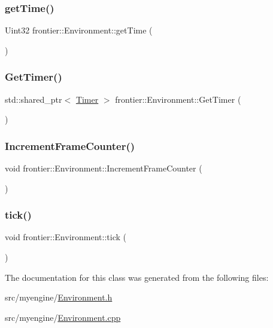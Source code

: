 \subsubsection{\texorpdfstring{get\+Time()}{getTime()}}
{\footnotesize\ttfamily Uint32 frontier\+::\+Environment\+::get\+Time (\begin{DoxyParamCaption}{ }\end{DoxyParamCaption})}

\mbox{\label{classfrontier_1_1_environment_a1e5a50e5f54b908516a24b02672ebab0}} 
\subsubsection{\texorpdfstring{Get\+Timer()}{GetTimer()}}
{\footnotesize\ttfamily std\+::shared\+\_\+ptr$<$ \hyperlink{classfrontier_1_1_timer}{Timer} $>$ frontier\+::\+Environment\+::\+Get\+Timer (\begin{DoxyParamCaption}{ }\end{DoxyParamCaption})}

\mbox{\label{classfrontier_1_1_environment_a8cc8f5708b26f9366e620d13bb031e42}} 
\subsubsection{\texorpdfstring{Increment\+Frame\+Counter()}{IncrementFrameCounter()}}
{\footnotesize\ttfamily void frontier\+::\+Environment\+::\+Increment\+Frame\+Counter (\begin{DoxyParamCaption}{ }\end{DoxyParamCaption})}

\mbox{\label{classfrontier_1_1_environment_aff2fa80de7560311e4b6fd5b74d8583e}} 
\subsubsection{\texorpdfstring{tick()}{tick()}}
{\footnotesize\ttfamily void frontier\+::\+Environment\+::tick (\begin{DoxyParamCaption}{ }\end{DoxyParamCaption})}



The documentation for this class was generated from the following files\+:\begin{DoxyCompactItemize}
\item 
src/myengine/\hyperlink{_environment_8h}{Environment.\+h}\item 
src/myengine/\hyperlink{_environment_8cpp}{Environment.\+cpp}\end{DoxyCompactItemize}
